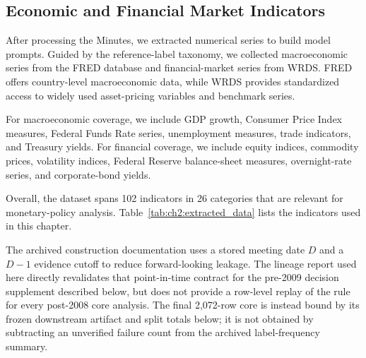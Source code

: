     

\subsection*{Economic and Financial Market Indicators}


After processing the Minutes, we extracted numerical series to build model prompts. Guided by the reference-label taxonomy, we collected macroeconomic series from the FRED database and financial-market series from WRDS. FRED offers country-level macroeconomic data, while WRDS provides standardized access to widely used asset-pricing variables and benchmark series.

For macroeconomic coverage, we include GDP growth, Consumer Price Index measures, Federal Funds Rate series, unemployment measures, trade indicators, and Treasury yields. For financial coverage, we include equity indices, commodity prices, volatility indices, Federal Reserve balance-sheet measures, overnight-rate series, and corporate-bond yields.


Overall, the dataset spans 102 indicators in 26 categories that are relevant for monetary-policy analysis. Table~\ref{tab:ch2:extracted_data} lists the indicators used in this chapter.

The archived construction documentation uses a stored meeting date $D$ and a
$D-1$ evidence cutoff to reduce forward-looking leakage. The lineage report
used here directly revalidates that point-in-time contract for the pre-2009
decision supplement described below, but does not provide a row-level replay of
the rule for every post-2008 core analysis. The final 2,072-row core is instead
bound by its frozen downstream artifact and split totals below; it is not
obtained by subtracting an unverified failure count from the archived
label-frequency summary.


